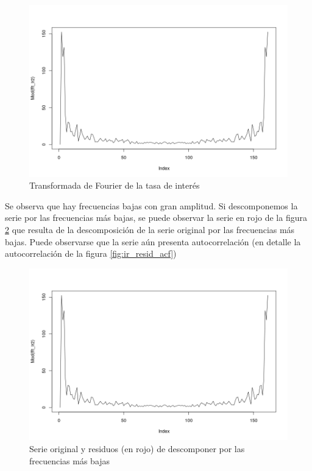 \documentclass[a4paper]{article}
\begin{document}
\begin{figure}[H]
	\centering
	\includegraphics[width=0.8\linewidth]{ir_fft.png}
	\caption{Transformada de Fourier de la tasa de interés} 	
	\label{fig:ir_fft}
\end{figure}

Se observa que hay frecuencias bajas con gran amplitud. Si descomponemos la serie por las frecuencias más bajas, se puede observar la serie en rojo de la figura \ref{fig:ir_orig_resid} que resulta de la descomposición de la serie original por las frecuencias más bajas. Puede observarse que la serie aún presenta autocorrelación (en detalle la autocorrelación de la figura \ref{fig:ir_resid_acf})

\begin{figure}[H]
	\centering
	\includegraphics[width=0.8\linewidth]{ir_fft.png}
	\caption{Serie original y residuos (en rojo) de descomponer por las frecuencias más bajas} 	
	\label{fig:ir_orig_resid}
\end{figure}
\end{document}
